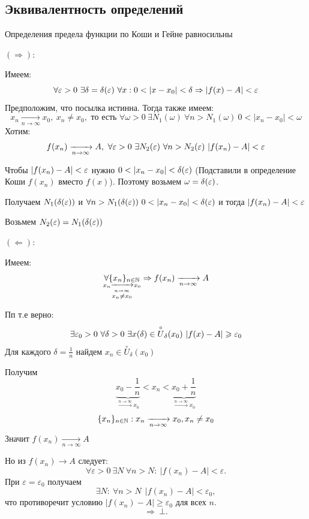 \subsection{Эквивалентность определений}

\begin{theorem}
    Определения предела функции по Коши и Гейне равносильны
\end{theorem}

\begin{Proof}
    {\bf $(\Rightarrow):$}

    Имеем:
    \[
        \forall \varepsilon > 0\ \exists \delta = \delta (\varepsilon )\ \forall x : 0 < |x - x_0| < \delta \Rightarrow |f(x) - A| < \varepsilon
    \]
    Предположим, что посылка истинна. Тогда также имеем:
    \[
        x_n \xrightarrow[n \to \infty ]{} x_0,\ x_n \neq x_0, \text{ то есть } \forall \omega > 0\ \exists N_1(\omega )\ \forall n > N_1(\omega )\ 0 < |x_n - x_0| < \omega 
    \]
    Хотим:
    \[
        f(x_n) \xrightarrow[n \to \infty ]{} A,\ \forall \eps > 0\ \exists N_2(\eps )\ \forall n > N_2(\eps )\ |f(x_n) - A| < \eps 
    \]

    Чтобы $|f(x_n) - A| < \varepsilon$ нужно $0 < |x_n - x_0| < \delta(\varepsilon )$ (Подставили в определение Коши $f(x_n)$ вместо $f(x)$). Поэтому возьмем $\omega = \delta (\varepsilon )$. 
    
    Получаем $N_1(\delta (\varepsilon ))$ и $\forall n > N_1(\delta (\varepsilon ))\ 0 < |x_n - x_0| < \delta (\varepsilon )$ и тогда $|f(x_n) - A| < \varepsilon $

    Возьмем $N_2(\varepsilon ) = N_1(\delta (\varepsilon ))$

    {\bf $(\Leftarrow):$}

    Имеем:
    \[
    \underset{
        \substack{
            x_n \xrightarrow[n \to \infty]{} x_0 \\ 
            x_n \neq x_0
        }
    }{\forall \{x_n\}_{n \in \mathbb{N}}} 
    \Rightarrow f(x_n) \xrightarrow[n \to \infty]{} A
    \]

    Пп т.е верно:
    \[
        \exists \eps_0 > 0\ \forall \delta > 0\ \exists x(\delta ) \in \overset{\circ}{U}_{\delta } (x_0)\ |f(x) - A| \geq \eps_0 
    \]
    Для каждого $\delta = \frac{1}{n} \text{ найдем } x_n \in \overset{\circ}{U}_{\delta } (x_0)$

    Получим
    \[
        \underbrace{x_0 - \frac{1}{n}}_{\xrightarrow{n \to \infty} x_0} 
        < x_n < 
        \underbrace{x_0 + \frac{1}{n}}_{\xrightarrow{n \to \infty} x_0}
    \]
    \[
        \{x_n \}_{n \in \mathbb{N}}: x_n \xrightarrow[n \to \infty ]{} x_0, x_n \neq x_0 
    \]
    Значит $f(x_n) \xrightarrow[n \to \infty ]{} A$

    Но из $f(x_n)\to A$ следует:
    \[
    \forall \varepsilon>0\ \exists N\ \forall n>N:\ |f(x_n)-A|<\varepsilon.
    \]
    При $\varepsilon=\varepsilon_0$ получаем
    \[
    \exists N:\ \forall n>N\ \ |f(x_n)-A|<\varepsilon_0,
    \]
    что противоречит условию $|f(x_n)-A|\ge \varepsilon_0$ для всех $n$.
    \[
    \Rightarrow\ \bot.
    \]
\end{Proof}

